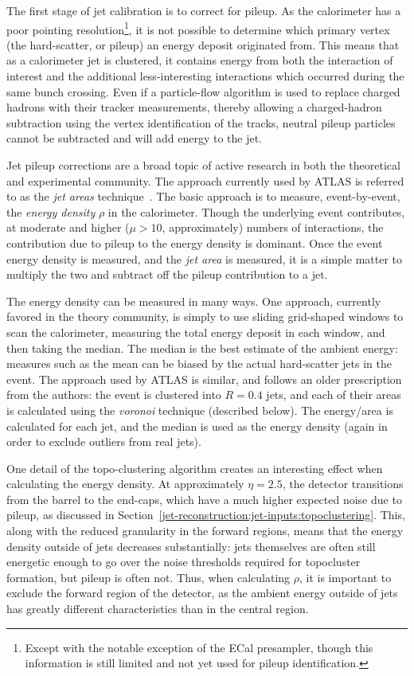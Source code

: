 The first stage of jet calibration is to correct for pileup. As the calorimeter has a poor pointing resolution\footnote{Except with the notable exception of the ECal presampler, though this information is still limited and not yet used for pileup identification.}, it is not possible to determine which primary vertex (the hard-scatter, or pileup) an energy deposit originated from. This means that as a calorimeter jet is clustered, it contains energy from both the interaction of interest and the additional less-interesting interactions which occurred during the same bunch crossing. Even if a particle-flow algorithm is used to replace charged hadrons with their tracker measurements, thereby allowing a charged-hadron subtraction using the vertex identification of the tracks, neutral pileup particles cannot be subtracted and will add energy to the jet. 

Jet pileup corrections are a broad topic of active research in both the theoretical and experimental community.  The approach currently used by ATLAS is referred to as the \textit{jet areas} technique~\cite{jetareas}. The basic approach is to measure, event-by-event, the \textit{energy density} $\rho$ in the calorimeter. Though the underlying event contributes, at moderate and higher ($\mu > 10$, approximately) numbers of interactions, the contribution due to pileup to the energy density is dominant. Once the event energy density is measured, and the \textit{jet area} is measured, it is a simple matter to multiply the two and subtract off the pileup contribution to a jet.

The energy density can be measured in many ways. One approach, currently favored in the theory community, is simply to use sliding grid-shaped windows to scan the calorimeter, measuring the total energy deposit in each window, and then taking the median. The median is the best estimate of the ambient energy: measures such as the mean can be biased by the actual hard-scatter jets in the event. The approach used by ATLAS is similar, and follows an older prescription from the authors: the event is clustered into \kt $R=0.4$ jets, and each of their areas is calculated using the \textit{voronoi} technique (described below). The energy/area is calculated for each jet, and the median is used as the energy density (again in order to exclude outliers from real jets).

One detail of the topo-clustering algorithm creates an interesting effect when calculating the energy density. At approximately $\eta = 2.5$, the detector transitions from the barrel to the end-caps, which have a much higher expected noise due to pileup, as discussed in Section~\ref{jet-reconstruction:jet-inputs:topoclustering}. This, along with the reduced granularity in the forward regions, means that the energy density outside of jets decreases substantially: jets themselves are often still energetic enough to go over the noise thresholds required for topocluster formation, but pileup is often not. Thus, when calculating $\rho$, it is important to exclude the forward region of the detector, as the ambient energy outside of jets has greatly different characteristics than in the central region.

